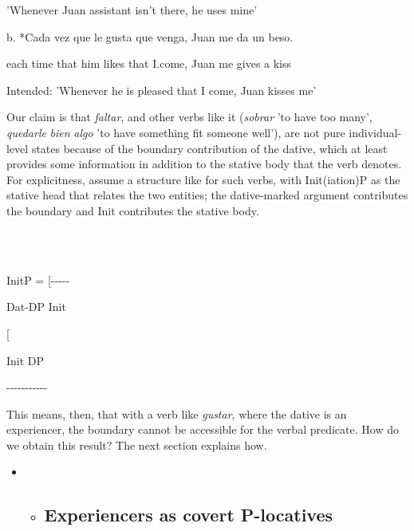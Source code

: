 \documentclass[output=paper,modfonts,nonflat]{langsci/langscibook}
\begin{document}
    {}'Whenever Juan assistant isn't there, he uses mine'

    b. *Cada vez  que le   gusta que venga,  Juan me  da    un beso.

         each time that him likes   that I.come, Juan me gives a     kiss

    Intended: 'Whenever he is pleased that I come, Juan kisses me'

Our claim is that \textit{faltar}, and other verbs like it (\textit{sobrar} 'to have too many', \textit{quedarle} \textit{bien} \textit{algo} 'to have something fit someone well'), are not pure individual-level states because of the boundary contribution of the dative, which at least provides some information in addition to the stative body that the verb denotes. For explicitness, assume a structure like  for such verbs, with Init(iation)P as the stative head that relates the two entities; the dative-marked argument contributes the boundary and Init contributes the stative body.

\ea%
    \label{ex:key:28}
    \gll\\
        \\
    \glt
    \z

                      InitP    = [-{}-{}-{}-{}-  


    Dat-DP                  Init

    [

                    Init                DP   

                {}-{}-{}-{}-{}-{}-{}-{}-{}-{}-{}-

This means, then, that with a verb like \textit{gustar}, where the dative is an experiencer, the boundary cannot be accessible for the verbal predicate. How do we obtain this result? The next section explains how.

\begin{itemize}
\item \begin{itemize}
\item \subsection{Experiencers as covert P-locatives}
\end{itemize}
\end{itemize}
\end{document}
